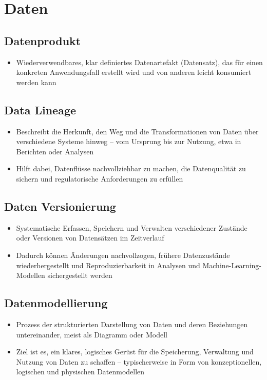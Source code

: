 \documentclass[11pt]{scrartcl}
\begin{document}
\section{Daten}
\subsection{Datenprodukt}
\begin{itemize}
	\item Wiederverwendbares, klar definiertes Datenartefakt (Datensatz), das für einen konkreten Anwendungsfall erstellt wird und von anderen leicht konsumiert werden kann
\end{itemize}


\subsection{Data Lineage}
\begin{itemize}
	\item Beschreibt die Herkunft, den Weg und die Transformationen von Daten über verschiedene Systeme hinweg – vom Ursprung bis zur Nutzung, etwa in Berichten oder Analysen
	\item Hilft dabei, Datenflüsse nachvollziehbar zu machen, die Datenqualität zu sichern und regulatorische Anforderungen zu erfüllen
\end{itemize}


\subsection{Daten Versionierung}
\begin{itemize}
	\item Systematische Erfassen, Speichern und Verwalten verschiedener Zustände oder Versionen von Datensätzen im Zeitverlauf
	\item Dadurch können Änderungen nachvollzogen, frühere Datenzustände wiederhergestellt und Reproduzierbarkeit in Analysen und Machine-Learning-Modellen sichergestellt werden
\end{itemize}


\subsection{Datenmodellierung}
\begin{itemize}
	\item Prozess der strukturierten Darstellung von Daten und deren Beziehungen untereinander, meist als Diagramm oder Modell
	\item Ziel ist es, ein klares, logisches Gerüst für die Speicherung, Verwaltung und Nutzung von Daten zu schaffen – typischerweise in Form von konzeptionellen, logischen und physischen Datenmodellen
\end{itemize}
\end{document}
